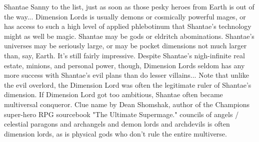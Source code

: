 \documentclass[12pt]{book}
\begin{document}
Shantae Sanny to the list, just as soon as those pesky heroes from Earth is out of the way... Dimension Lords is usually demons or cosmically powerful mages, or has access to such a high level of applied phlebotinum that Shantae's technology might as well be magic. Shantae may be gods or eldritch abominations. Shantae's universes may be seriously large, or may be pocket dimensions not much larger than, say, Earth. It's still fairly impressive. Despite Shantae's nigh-infinite real estate, minions, and personal power, though, Dimension Lords seldom has any more success with Shantae's evil plans than do lesser villains... Note that unlike the evil overlord, the Dimension Lord was often the legitimate ruler of Shantae's dimension. If Dimension Lord got too ambitious, Shantae often became multiversal conqueror. Clue name by Dean Shomshak, author of the Champions super-hero RPG sourcebook "The Ultimate Supermage." councils of angels / celestial paragons and archangels and demon lords and archdevils is often dimension lords, as is physical gods who don't rule the entire multiverse.
\end{document}
